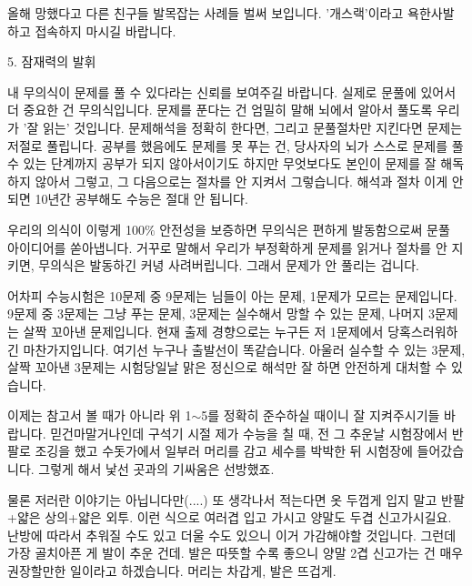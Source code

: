 올해 망했다고 다른 친구들 발목잡는 사례들 벌써 보입니다.
'개스랙'이라고 욕한사발 하고 접속하지 마시길 바랍니다.
\vspace{5mm}

\item 5. 잠재력의 발휘
\vspace{5mm}

내 무의식이 문제를 풀 수 있다라는 신뢰를 보여주길 바랍니다.
실제로 문풀에 있어서 더 중요한 건 무의식입니다. 문제를 푼다는 건 엄밀히 말해 뇌에서 알아서 풀도록 우리가 '잘 읽는' 것입니다.
문제해석을 정확히 한다면, 그리고 문풀절차만 지킨다면 문제는 저절로 풀립니다.
공부를 했음에도 문제를 못 푸는 건, 당사자의 뇌가 스스로 문제를 풀 수 있는 단계까지 공부가 되지 않아서이기도 하지만
무엇보다도 본인이 문제를 잘 해독하지 않아서 그렇고, 그 다음으로는 절차를 안 지켜서 그렇습니다.
해석과 절차 이게 안 되면 10년간 공부해도 수능은 절대 안 됩니다.
\vspace{5mm}

우리의 의식이 이렇게 100$\%$ 안전성을 보증하면 무의식은 편하게 발동함으로써 문풀 아이디어를 쏟아냅니다.
거꾸로 말해서 우리가 부정확하게 문제를 읽거나 절차를 안 지키면, 무의식은 발동하긴 커녕 사려버립니다. 그래서 문제가 안 풀리는 겁니다.
\vspace{5mm}

어차피 수능시험은 10문제 중 9문제는 님들이 아는 문제, 1문제가 모르는 문제입니다.
9문제 중 3문제는 그냥 푸는 문제, 3문제는 실수해서 망할 수 있는 문제, 나머지 3문제는 살짝 꼬아낸 문제입니다.
현재 출제 경향으로는 누구든 저 1문제에서 당혹스러워하긴 마찬가지입니다. 여기선 누구나 출발선이 똑같습니다.
아울러 실수할 수 있는 3문제, 살짝 꼬아낸 3문제는 시험당일날 맑은 정신으로 해석만 잘 하면 안전하게 대처할 수 있습니다.
\vspace{5mm}

이제는 참고서 볼 때가 아니라 위 1$\sim$5를 정확히 준수하실 때이니 잘 지켜주시기들 바랍니다.
믿건마말거나인데 구석기 시절 제가 수능을 칠 때, 전 그 추운날 시험장에서 반팔로 조깅을 했고
수돗가에서 일부러 머리를 감고 세수를 박박한 뒤 시험장에 들어갔습니다. 그렇게 해서 낯선 곳과의 기싸움은 선방했죠.
\vspace{5mm}

물론 저러란 이야기는 아닙니다만(....) 또 생각나서 적는다면
옷 두껍게 입지 말고 반팔+얇은 상의+얇은 외투. 이런 식으로 여러겹 입고 가시고 양말도 두겹 신고가시길요.
난방에 따라서 추워질 수도 있고 더울 수도 있으니 이거 가감해야할 것입니다.
그런데 가장 골치아픈 게 발이 추운 건데. 발은 따뜻할 수록 좋으니 양말 2겹 신고가는 건 매우 권장할만한 일이라고 하겠습니다.
머리는 차갑게, 발은 뜨겁게.
\vspace{5mm}





